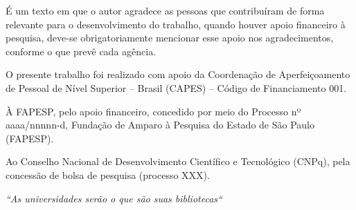 \documentclass[
  12pt,		%
  a4paper,	%
  openright,  %
  oneside,	%
  chapter=TITLE,		%
  section=TITLE,		%
  english,	%
  french,	    %
  spanish,	%
  brazil	    %
]{abntex2}
\begin{document}
    \begin{agradecimentos}
                  
        É um texto em que o autor agradece as pessoas que contribuíram de forma relevante para o desenvolvimento do trabalho, quando houver apoio financeiro à pesquisa, deve-se obrigatoriamente mencionar esse apoio nos agradecimentos, conforme o que prevê cada agência.
        
        O presente trabalho foi realizado com apoio da Coordenação de Aperfeiçoamento de Pessoal de Nível Superior – Brasil (CAPES) – Código de Financiamento 001.
        
        À FAPESP, pelo apoio financeiro, concedido por meio do Processo nº aaaa/nnnnn-d, Fundação de Amparo à Pesquisa do Estado de São Paulo (FAPESP).
        
        Ao Conselho Nacional de Desenvolvimento Científico e Tecnológico (CNPq), pela concessão de bolsa de pesquisa (processo XXX).

    
    \end{agradecimentos}
    
   
    
    \begin{epigrafe}
        \vspace*{\fill}
    	\begin{flushright}
    		\textit{
        		``As universidades serão o que são suas bibliotecas``\\ 
        		\cite[~ p. 19, tradução nossa]{Gelfand}
            		}
    	\end{flushright}
    \end{epigrafe}
    
\end{document}
